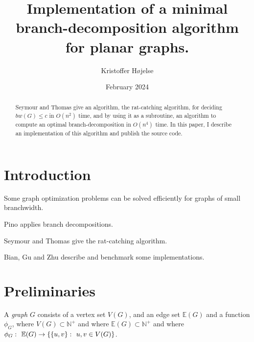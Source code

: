 \documentclass{article}
\title{Implementation of a minimal branch-decomposition algorithm for planar graphs.}
\author{Kristoffer Højelse}
\date{February 2024}
\begin{document}
\maketitle


\begin{abstract}
	Seymour and Thomas give an algorithm, the rat-catching algorithm, for deciding $bw(G) \leq c$ in $O(n^2)$ time, and by using it as a subroutine, an algorithm to compute an optimal branch-decomposition in $O(n^4)$ time. In this paper, I describe an implementation of this algorithm and publish the source code.
\end{abstract}


\section{Introduction}
	Some graph optimization problems can be solved efficiently for graphs of small branchwidth.\cite{CNP+11}

	Pino\cite{Pin16} applies branch decompositions.

	Seymour and Thomas\cite{ST93} give the rat-catching algorithm.

	Bian, Gu and Zhu\cite{BGZ15} describe and benchmark some implementations.


\section{Preliminaries}

	A \textit{graph} $G$ consists of a vertex set $V(G)$, and an edge set $\mathbb{E}(G)$ and a function $\phi_G$, where $V(G) \subset \mathbb{N}^+$ and where $\mathbb{E}(G) \subset \mathbb{N}^+$ and where $\phi_G \,\colon\  \mathbb{E}(G) \to \{\{u,v\} \,\colon\  u,v \in V(G)\}$.
	
\end{document}
